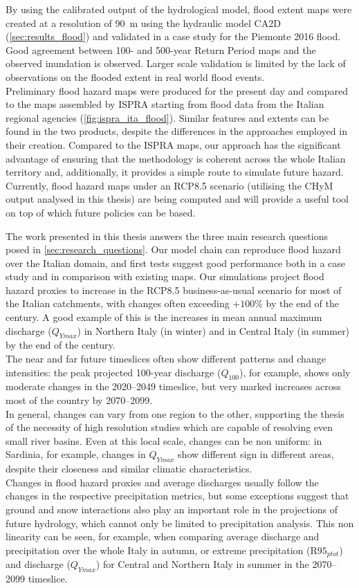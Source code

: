 By using the calibrated output of the hydrological model, flood extent maps were created at a resolution of \SI{90}{\meter} using the hydraulic model CA2D (\cref{sec:results_flood}) and validated in a case study for the Piemonte 2016 flood.
Good agreement between 100- and 500-year Return Period maps and the observed inundation is observed.
Larger scale validation is limited by the lack of observations on the flooded extent in real world flood events.\\
Preliminary flood hazard maps were produced for the present day and compared to the maps assembled by ISPRA starting from flood data from the Italian regional agencies (\cref{fig:ispra_ita_flood}).
Similar features and extents can be found in the two products, despite the differences in the approaches employed in their creation.
Compared to the ISPRA maps, our approach has the significant advantage of ensuring that the methodology is coherent across the whole Italian territory and, additionally, it provides a simple route to simulate future hazard.
Currently, flood hazard maps under an RCP8.5 scenario (utilising the CHyM output analysed in this thesis) are being computed and will provide a useful tool on top of which future policies can be based.

The work presented in this thesis answers the three main research questions posed in \cref{sec:research_questions}.
Our model chain can reproduce flood hazard over the Italian domain, and first tests suggest good performance both in a case study and in comparison with existing maps.
Our simulations project flood hazard proxies to increase in the RCP8.5 business-as-usual scenario for most of the Italian catchments, with changes often exceeding $+100 \%$ by the end of the century.
A good example of this is the increases in mean annual maximum discharge ($Q_{Ymax}$) in Northern Italy (in winter) and in Central Italy (in summer) by the end of the century.\\
The near and far future timeslices often show different patterns and change intensities: the peak projected 100-year discharge ($Q_{100}$), for example, shows only moderate changes in the 2020--2049 timeslice, but very marked increases across most of the country by 2070--2099.\\
In general, changes can vary from one region to the other, supporting the thesis of the necessity of high resolution studies which are capable of resolving even small river basins.
Even at this local scale, changes can be non uniform: in Sardinia, for example, changes in $Q_{Ymax}$ show different sign in different areas, despite their closeness and similar climatic characteristics.\\
Changes in flood hazard proxies and average discharges usually follow the changes in the respective precipitation metrics, but some exceptions suggest that ground and snow interactions also play an important role in the projections of future hydrology, which cannot only be limited to precipitation analysis.
This non linearity can be seen, for example, when comparing average discharge and precipitation over the whole Italy in autumn, or extreme precipitation ($\textrm{R95}_{ptot}$) and discharge ($Q_{Ymax}$) for Central and Northern Italy in summer in the 2070--2099 timeslice.

